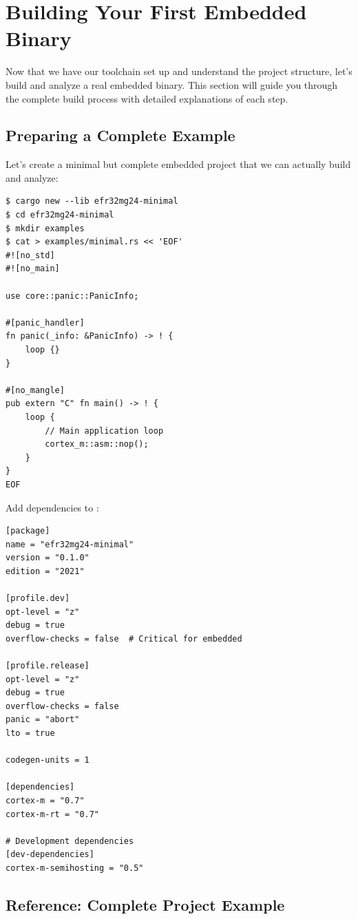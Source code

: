 \section{Building Your First Embedded Binary}
\label{sec:building-first-binary}


Now that we have our toolchain set up and understand the project structure, let's build and analyze a real embedded binary. This section will guide you through the complete build process with detailed explanations of each step.

\subsection{Preparing a Complete Example}
\label{sec:complete-example}

Let's create a minimal but complete embedded project that we can actually build and analyze:
\begin{verbatim}
$ cargo new --lib efr32mg24-minimal
$ cd efr32mg24-minimal
$ mkdir examples
$ cat > examples/minimal.rs << 'EOF'
#![no_std]
#![no_main]

use core::panic::PanicInfo;

#[panic_handler]
fn panic(_info: &PanicInfo) -> ! {
    loop {}
}

#[no_mangle]
pub extern "C" fn main() -> ! {
    loop {
        // Main application loop
        cortex_m::asm::nop();
    }
}
EOF
\end{verbatim}

Add dependencies to :\

\begin{verbatim}
[package]
name = "efr32mg24-minimal"
version = "0.1.0"
edition = "2021"

[profile.dev]
opt-level = "z"
debug = true
overflow-checks = false  # Critical for embedded

[profile.release]
opt-level = "z"
debug = true
overflow-checks = false
panic = "abort"
lto = true

codegen-units = 1

[dependencies]
cortex-m = "0.7"
cortex-m-rt = "0.7"

# Development dependencies
[dev-dependencies]
cortex-m-semihosting = "0.5"
\end{verbatim}

\subsection{Reference: Complete Project Example}
\label{subsec:reference-complete-project}

